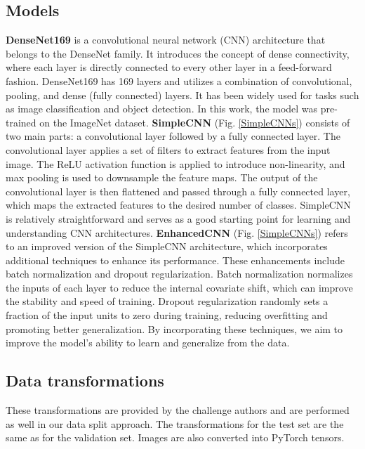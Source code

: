 \documentclass[runningheads]{llncs}
\begin{document}
\subsection{Models}
\textbf{DenseNet169} is a convolutional neural network (CNN) architecture that belongs to the DenseNet family. It introduces the concept of dense connectivity, where each layer is directly connected to every other layer in a feed-forward fashion. DenseNet169 has 169 layers and utilizes a combination of convolutional, pooling, and dense (fully connected) layers. It has been widely used for tasks such as image classification and object detection. In this work, the model was pre-trained on the ImageNet dataset.
\newline
\textbf{SimpleCNN} (Fig. \ref{SimpleCNNs}) consists of two main parts: a convolutional layer followed by a fully connected layer. The convolutional layer applies a set of filters to extract features from the input image. The ReLU activation function is applied to introduce non-linearity, and max pooling is used to downsample the feature maps. The output of the convolutional layer is then flattened and passed through a fully connected layer, which maps the extracted features to the desired number of classes. SimpleCNN is relatively straightforward and serves as a good starting point for learning and understanding CNN architectures.
\newline
\textbf{EnhancedCNN} (Fig. \ref{SimpleCNNs}) refers to an improved version of the SimpleCNN architecture, which incorporates additional techniques to enhance its performance. These enhancements include batch normalization and dropout regularization. Batch normalization normalizes the inputs of each layer to reduce the internal covariate shift, which can improve the stability and speed of training. Dropout regularization randomly sets a fraction of the input units to zero during training, reducing overfitting and promoting better generalization. By incorporating these techniques, we aim to improve the model's ability to learn and generalize from the data.

\subsection{Data transformations}
These transformations are provided by the challenge authors and are performed as well in our data split approach. The transformations for the test set are the same as for the validation set. Images are also converted into PyTorch tensors.\par
\end{document}
